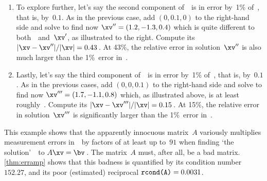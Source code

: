 \begin{example}
\begin{enumerate}
\item 
\begin{figbox}{}%
To explore further, let's say the second component of~\bv\ is in error by~1\% of~\bv, that is, by~\(0.1\).
As in the previous case, add \((0,0.1,0)\) to the right-hand side and solve to find now \(\xv''=(1.2,-1.3,0.4)\) which is quite different to both~\xv\ and~\(\xv'\), as illustrated to the right.
Compute its  \(|\xv-\xv''|/|\xv|=0.43\)\,.
At 43\%, the relative error in solution~\(\xv''\) is also much larger than the 1\%~error in~\bv.
\end{figbox}


\item Lastly, let's say the third component of~\bv\ is in error by~1\% of~\bv, that is, by~\(0.1\).
As in the previous cases, add \((0,0,0.1)\) to the right-hand side and solve to find now \(\xv'''=(1.7,-1.1,0.8)\) which, as illustrated above, is at least roughly~\xv.
Compute its  \(|\xv-\xv'''|/|\xv|=0.15\)\,.
At 15\%, the relative error in solution~\(\xv'''\) is significantly larger than the 1\%~error in~\bv.

\end{enumerate}
This example shows that the apparently innocuous matrix~\(A\) variously multiplies measurement errors in~\bv\ by factors of at least up to~\(91\) when finding `the solution'~\xv\ to \(A\xv=\bv\)\,.
The matrix~\(A\) must, after all, be a bad matrix.
\cref{thm:erramp} shows that this badness is quantified by its  condition number~\(152.27\), and its poor (estimated) reciprocal \(\verb|rcond(A)|=0.0031\). 
\end{example}




